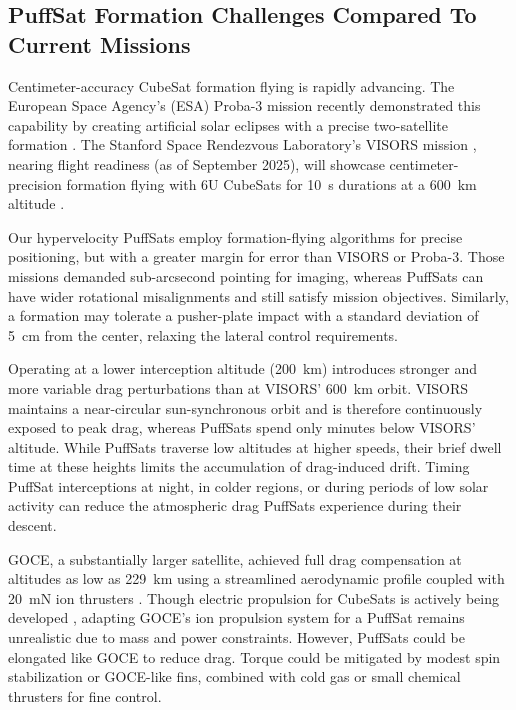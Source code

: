 \documentclass{article}
\begin{document}
\subsection{PuffSat Formation Challenges Compared To Current Missions}\label{sec:formation_challenges_current_missions}
Centimeter-accuracy CubeSat formation flying is rapidly advancing. The European Space Agency's (ESA) Proba-3 mission recently demonstrated this capability by creating artificial solar eclipses with a precise two-satellite formation \cite{esa_proba_3}. The Stanford Space Rendezvous Laboratory's VISORS mission \cite{guffanti2023autonomous}, nearing flight readiness (as of September 2025), will showcase centimeter-precision formation flying with 6U CubeSats for \SI{10}{\second} durations at a \SI{600}{\kilo\meter} altitude \cite{visors_formation_flying}.

Our hypervelocity PuffSats employ formation-flying algorithms for precise positioning, but with a greater margin for error than VISORS or Proba-3. Those missions demanded sub-arcsecond pointing for imaging, whereas PuffSats can have wider rotational misalignments and still satisfy mission objectives. Similarly, a formation may tolerate a pusher-plate impact with a standard deviation of \SI{5}{\centi\meter} from the center, relaxing the lateral control requirements.

Operating at a lower interception altitude (\SI{200}{\kilo\meter}) introduces stronger and more variable drag perturbations than at VISORS' \SI{600}{\kilo\meter} orbit. VISORS maintains a near-circular sun-synchronous orbit and is therefore continuously exposed to peak drag, whereas PuffSats spend only minutes below VISORS' altitude. While PuffSats traverse low altitudes at higher speeds, their brief dwell time at these heights limits the accumulation of drag-induced drift.  Timing PuffSat interceptions at night, in colder regions, or during periods of low solar activity can reduce the atmospheric drag PuffSats experience during their descent.

GOCE, a substantially larger satellite, achieved full drag compensation at altitudes as low as  \SI{229}{\kilo\meter} using a streamlined aerodynamic profile coupled with \SI{20}{\milli\newton} ion thrusters \cite{goce_dragfree, goce_229km}. Though electric propulsion for CubeSats is actively being developed \cite{busek_iodine}, adapting GOCE's ion propulsion system for a PuffSat remains unrealistic due to mass and power constraints. However, PuffSats could be elongated like GOCE to reduce drag. Torque could be mitigated by modest spin stabilization or GOCE-like fins, combined with cold gas or small chemical thrusters for fine control.
\end{document}
